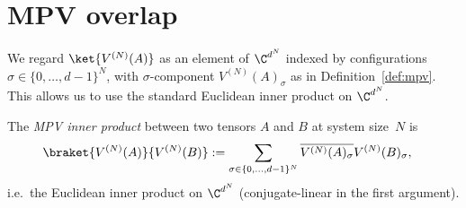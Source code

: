 \section{MPV overlap}

\begin{definition}\label{def:mpv_state}
    \leanok
    We regard $\ket{V^{(N)}(A)}$ as an element of $\C^{d^N}$
    indexed by configurations
    $\sigma \in \{0,\ldots,d{-}1\}^N$,
    with $\sigma$-component $V^{(N)}(A)_\sigma$ as in
    Definition~\ref{def:mpv}.
    This allows us to use the standard Euclidean inner product
    on $\C^{d^N}$.
\end{definition}

\begin{definition}\label{def:mpv_inner}
    \leanok
    The \emph{MPV inner product} between two tensors $A$ and $B$
    at system size~$N$ is
    \begin{align}
        \braket{V^{(N)}(A)}{V^{(N)}(B)}
         & :=
        \sum_{\sigma \in \{0,\ldots,d{-}1\}^N}
        \overline{V^{(N)}(A)_\sigma} V^{(N)}(B)_\sigma,
        \label{eq:mps_inner_product}
    \end{align}
    i.e.\ the Euclidean inner product on $\C^{d^N}$
    (conjugate-linear in the first argument).
\end{definition}

